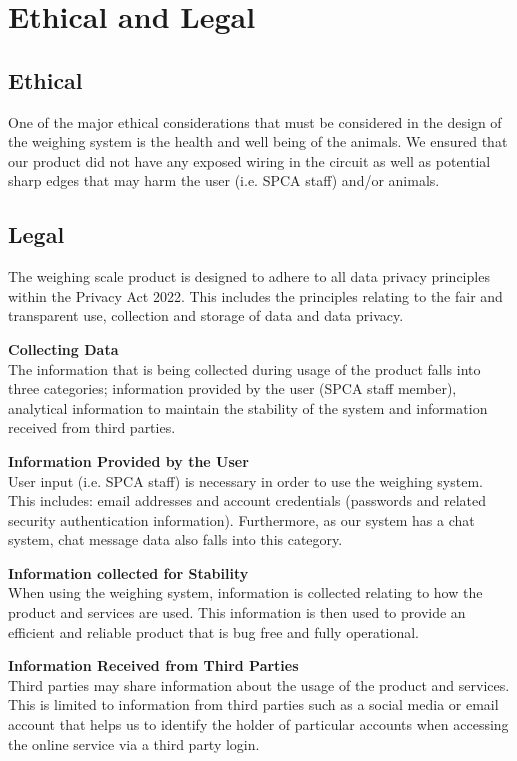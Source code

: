\section{Ethical and Legal}

\subsection{Ethical}
One of the major ethical considerations that must be considered in the design of the weighing system is the health and well being of the animals. We ensured that our product did not have any exposed wiring in the circuit as well as potential sharp edges that may harm the user (i.e. SPCA staff) and/or animals. 

\subsection{Legal}
The weighing scale product is designed to adhere to all data privacy principles within the Privacy Act 2022. This includes the principles relating to the fair and transparent use, collection and storage of data and data privacy.

\textbf{Collecting Data}\\
The information that is being collected during usage of the product falls into three categories; information provided by the user (SPCA staff member), analytical information to maintain the stability of the system and information received from third parties. 

\textbf{Information Provided by the User}\\
User input (i.e. SPCA staff) is necessary in order to use the weighing system. This includes: email addresses and account credentials (passwords and related security authentication information). Furthermore, as our system has a chat system, chat message data also falls into this category.

\textbf{Information collected for Stability}\\
When using the weighing system, information is collected relating to how the product and services are used. This information is then used to provide an efficient and reliable product that is bug free and fully operational.

\textbf{Information Received from Third Parties}\\
Third parties may share information about the usage of the product and services. This is limited to information from third parties such as a social media or email account that helps us to identify the holder of particular accounts when accessing the online service via a third party login.

